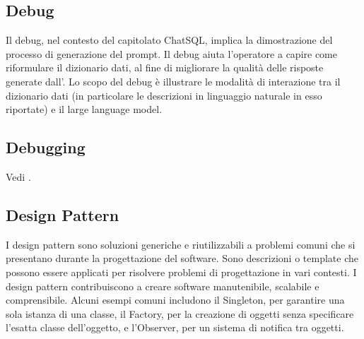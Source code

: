 \vspace{2em}
\subsection*{Debug}
\par Il debug, nel contesto del capitolato ChatSQL, implica la dimostrazione del processo di generazione del prompt. Il debug aiuta l'operatore a capire come riformulare il dizionario dati, al fine di migliorare la qualità delle risposte generate dall'. Lo scopo del debug è illustrare le modalità di interazione tra il dizionario dati (in particolare le descrizioni in linguaggio naturale in esso riportate) e il large language model.


\vspace{2em}
\subsection*{Debugging}
\par Vedi .

\vspace{2em}
\subsection*{Design Pattern}
\par I design pattern sono soluzioni generiche e riutilizzabili a problemi comuni che si presentano durante la progettazione del software. Sono descrizioni o template che possono essere applicati per risolvere problemi di progettazione in vari contesti. I design pattern contribuiscono a creare software manutenibile, scalabile e comprensibile. Alcuni esempi comuni includono il Singleton, per garantire una sola istanza di una classe, il Factory, per la creazione di oggetti senza specificare l'esatta classe dell'oggetto, e l'Observer, per un sistema di notifica tra oggetti.

